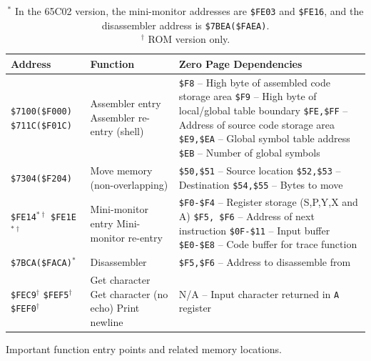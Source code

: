 \documentclass[12pt]{article}
\begin{document}
\begin{table}[htb]
	\centering
	\begin{tabular}{|p{2.8cm}|p{4.7cm}|p{8.5cm}|}
		\hline
		\textbf{Address} & \textbf{Function} & \textbf{Zero Page Dependencies} \\
		\hline
		\texttt{\$7100(\$F000)} \newline
		\texttt{\$711C(\$F01C)} & 
		\raggedright Assembler entry Assembler re-entry (shell) & 
		\texttt{\$F8} -- High byte of assembled code storage area \newline
		\texttt{\$F9} -- High byte of local/global table boundary \newline
		\texttt{\$FE,\$FF} -- Address of source code storage area \newline
		\texttt{\$E9,\$EA} -- Global symbol table address \newline
		\texttt{\$EB} -- Number of global symbols \\
		\hline
		\texttt{\$7304(\$F204)} & 
		\raggedright Move memory (non\hbox{-}overlapping) & 
		\texttt{\$50,\$51} -- Source location \newline
		\texttt{\$52,\$53} -- Destination \newline
		\texttt{\$54,\$55} -- Bytes to move \\
		\hline
		\texttt{\$FE14}\ensuremath{^{*\dagger}} \newline
		\texttt{\$FE1E}\ensuremath{^{*\dagger}} & 
		\raggedright Mini-monitor entry \newline
		Mini-monitor re-entry & 
		\texttt{\$F0-\$F4} -- Register storage (S,P,Y,X and A) \newline
		\texttt{\$F5, \$F6} -- Address of next instruction \newline
		\texttt{\$0F-\$11} -- Input buffer \newline
		\texttt{\$E0-\$E8} -- Code buffer for trace function \\
		\hline
		\texttt{\$7BCA(\$FACA)}\ensuremath{^{*}} & 
		Disassembler & 
		\texttt{\$F5,\$F6} -- Address to disassemble from \\
		\hline
		\texttt{\$FEC9}\ensuremath{^{\dagger}} \newline
		\texttt{\$FEF5}\ensuremath{^{\dagger}} \newline
		\texttt{\$FEF0}\ensuremath{^{\dagger}} &
		Get character \newline
		Get character (no echo) \newline
		Print newline &
		N/A -- Input character returned in \texttt{A} register \\
		\hline
	\end{tabular}
	\caption{Important function entry points and related memory locations.}
	\caption*{
	\ensuremath{^{*}} In the 65C02 version, the mini-monitor addresses are \texttt{\$FE03} and \texttt{\$FE16}, and the disassembler address is \texttt{\$7BEA(\$FAEA)}. \\
	\ensuremath{^{\dagger}} ROM version only.
	}
	\label{tab:entrypoints}
\end{table}
\end{document}

